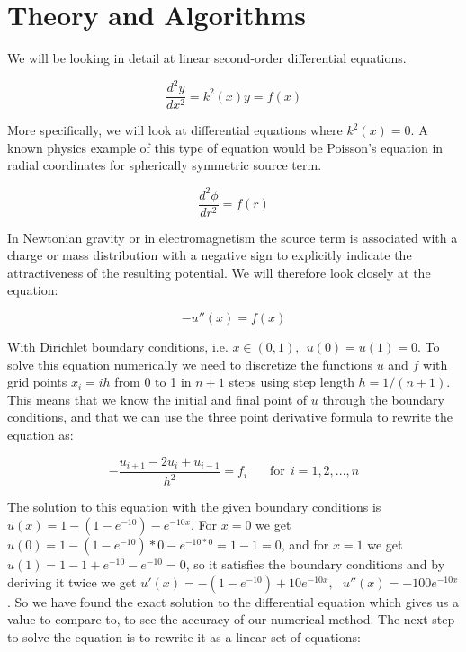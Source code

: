 \documentclass[a4paper,11pt]{article}
\begin{document}
{		\section*{Theory and Algorithms}
		
		We will be looking in detail at linear second-order differential equations.
		
		$$\frac{d^2y}{dx^2} = k^2(x) y = f(x)$$
		
		More specifically, we will look at differential equations where $k^2(x) = 0$. A known physics example of this type of equation would be Poisson's equation in radial coordinates for spherically symmetric source term.
		
		$$\frac{d^2 \phi}{d r^2} = f(r)$$
		
		In Newtonian gravity or in electromagnetism the source term is associated with a charge or mass distribution with a negative sign to explicitly indicate the attractiveness of the resulting potential. We will therefore look closely at the equation:
		
		\begin{equation}
			- u''(x) = f(x)
			\label{diff_eq}
		\end{equation}
		
		With Dirichlet boundary conditions, i.e. $ x \in (0,1), \: \: u(0) = u(1) = 0$. To solve this equation numerically we need to discretize the functions $u$ and $f$ with grid points $x_i = i h$ from 0 to 1 in $n+1$ steps using step length $h = 1/(n+1)$. This means that we know the initial and final point of $u$ through the boundary conditions, and that we can use the three point derivative formula to rewrite the equation as:
		
		\begin{equation}
			- \frac{u_{i+1} - 2u_i + u_{i-1}}{h^2} = f_i \: \: \: \: \: \: \: \: \text{for} \: \: i = 1, 2, ... , n
			\label{disc_diff_eq}
		\end{equation}
		
		The solution to this equation with the given boundary conditions is $u(x) = 1 - (1-e^{-10}) - e^{-10x}$. For $x = 0$ we get $u(0) = 1 - (1 - e^{-10})*0 - e^{-10 * 0} = 1-1 = 0$, and for $x = 1$ we get $u(1) = 1 - 1 + e^{-10} - e^{-10} = 0$, so it satisfies the boundary conditions and by deriving it twice we get $u'(x) = -(1-e^{-10}) + 10e^{-10x}, \: \: \: u''(x) = -100 e^{-10x}$. So we have found the exact solution to the differential equation which gives us a value to compare to, to see the accuracy of our numerical method. The next step to solve the equation is to rewrite it as a linear set of equations:
		
}
\end{document}
